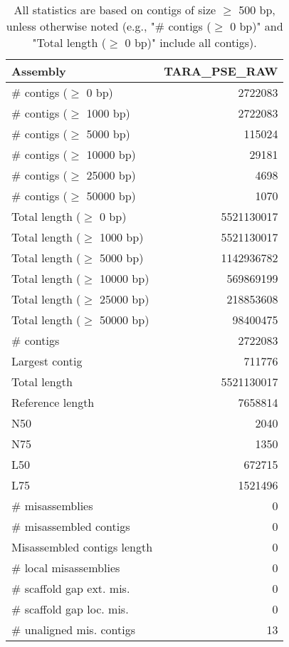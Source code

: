 \documentclass[12pt,a4paper]{article}
\begin{document}
\begin{table}[ht]
\begin{center}
\caption{All statistics are based on contigs of size $\geq$ 500 bp, unless otherwise noted (e.g., "\# contigs ($\geq$ 0 bp)" and "Total length ($\geq$ 0 bp)" include all contigs).}
\begin{tabular}{|l*{1}{|r}|}
\hline
Assembly & TARA\_PSE\_RAW \\ \hline
\# contigs ($\geq$ 0 bp) & 2722083 \\ \hline
\# contigs ($\geq$ 1000 bp) & 2722083 \\ \hline
\# contigs ($\geq$ 5000 bp) & 115024 \\ \hline
\# contigs ($\geq$ 10000 bp) & 29181 \\ \hline
\# contigs ($\geq$ 25000 bp) & 4698 \\ \hline
\# contigs ($\geq$ 50000 bp) & 1070 \\ \hline
Total length ($\geq$ 0 bp) & 5521130017 \\ \hline
Total length ($\geq$ 1000 bp) & 5521130017 \\ \hline
Total length ($\geq$ 5000 bp) & 1142936782 \\ \hline
Total length ($\geq$ 10000 bp) & 569869199 \\ \hline
Total length ($\geq$ 25000 bp) & 218853608 \\ \hline
Total length ($\geq$ 50000 bp) & 98400475 \\ \hline
\# contigs & 2722083 \\ \hline
Largest contig & 711776 \\ \hline
Total length & 5521130017 \\ \hline
Reference length & 7658814 \\ \hline
N50 & 2040 \\ \hline
N75 & 1350 \\ \hline
L50 & 672715 \\ \hline
L75 & 1521496 \\ \hline
\# misassemblies & 0 \\ \hline
\# misassembled contigs & 0 \\ \hline
Misassembled contigs length & 0 \\ \hline
\# local misassemblies & 0 \\ \hline
\# scaffold gap ext. mis. & 0 \\ \hline
\# scaffold gap loc. mis. & 0 \\ \hline
\# unaligned mis. contigs & 13 \\ \hline

\end{tabular}
\end{center}
\end{table}
\end{document}

